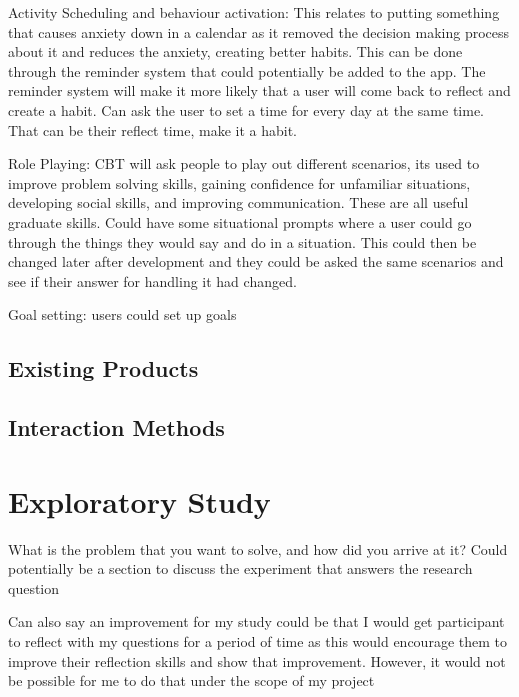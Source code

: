 \documentclass{l4proj}
\begin{document}
Activity Scheduling and behaviour activation: This relates to putting something that causes anxiety down in a calendar as it removed the decision making process 
about it and reduces the anxiety, creating better habits. This can be done through the reminder system that could potentially be added to the app. The reminder 
system will make it more likely that a user will come back to reflect and create a habit. Can ask the user to set a time for every day at the same time. That 
can be their reflect time, make it a habit.

Role Playing: CBT will ask people to play out different scenarios, its used to improve problem solving skills, gaining confidence for unfamiliar situations, 
developing social skills, and improving communication. These are all useful graduate skills. Could have some situational prompts where a user could go through 
the things they would say and do in a situation. This could then be changed later after development and they could be asked the same scenarios and see if their 
answer for handling it had changed.

Goal setting: users could set up goals




\section{Existing Products}

\section{Interaction Methods}


\chapter{Exploratory Study} \label{ExploratoryStudy}
What is the problem that you want to solve, and how did you arrive at it?
Could potentially be a section to discuss the experiment that answers the research question 


Can also say an improvement for my study could be that I would get participant to reflect with my questions for a period of time as this would encourage 
them to improve their reflection skills and show that improvement. However, it would not be possible for me to do that under the scope of my project
\end{document}
